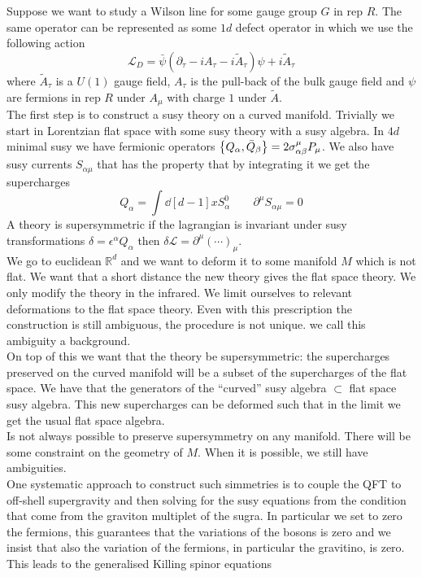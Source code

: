\documentclass[11pt]{article}
\theoremstyle{definition}
\numberwithin{equation}{section}
\begin{document}
Suppose we want to study a Wilson line for some gauge group $G$ in rep $R$. The same operator can be represented as some $1d$ defect operator in which we use the following action
\begin{equation}
	\mathcal{L}_{D} = \bar{\psi}(\partial_{\tau}-iA_{\tau}-i\tilde{A}_{\tau})\psi+i\tilde{A}_{\tau}
\end{equation}
where $\tilde{A}_{\tau}$ is a $U(1)$ gauge field, $A_{\tau}$ is the pull-back of the bulk gauge field and $\psi$ are fermions in rep $R$ under $A_{\mu}$ with charge $1$ under $\tilde{A}$.\\

The first step is to construct a susy theory on a curved manifold. Trivially we start in Lorentzian flat space with some susy theory with a susy algebra. In $4d$ minimal susy we have fermionic operators $\acomm{Q_{\alpha}}{\bar{Q}_{\beta}}=2\sigma^{\mu}_{\alpha\beta}P_{\mu}$. We also have susy currents $S_{\alpha\mu}$ that has the property that by integrating it we get the supercharges
\begin{equation}
	Q_{\alpha} = \int \dd[d-1]{x} S_{\alpha}^{0} \qquad \partial^{\mu}S_{\alpha\mu}=0
\end{equation}
A theory is supersymmetric if the lagrangian is invariant under susy transformations $\delta = \epsilon^{\alpha}Q_{\alpha}$ then $\delta\mathcal{L}=\partial^{\mu}(\cdots)_{\mu}$.\\
We go to euclidean $\mathbb{R}^{d}$ and we want to deform it to some manifold $M$ which is not flat. We want that a short distance the new theory gives the flat space theory. We only modify the theory in the infrared. We limit ourselves to relevant deformations to the flat space theory. Even with this prescription the construction is still ambiguous, the procedure is not unique. we call this ambiguity a background.\\
On top of this we want that the theory be supersymmetric: the supercharges preserved on the curved manifold will be a subset of the supercharges of the flat space. We have that the generators of the ``curved'' susy algebra $\subset$ flat space susy algebra. This new supercharges can be deformed such that in the limit we get the usual flat space algebra.\\
Is not always possible to preserve supersymmetry on any manifold. There will be some constraint on the geometry of $M$. When it is possible, we still have ambiguities.\\
One systematic approach to construct such simmetries is to couple the QFT to off-shell supergravity and then solving for the susy equations from the condition that come from the graviton multiplet of the sugra. In particular we set to zero the fermions, this guarantees that the variations of the bosons is zero and we insist that also the variation of the fermions, in particular the gravitino, is zero. This leads to the generalised Killing spinor equations
\end{document}
